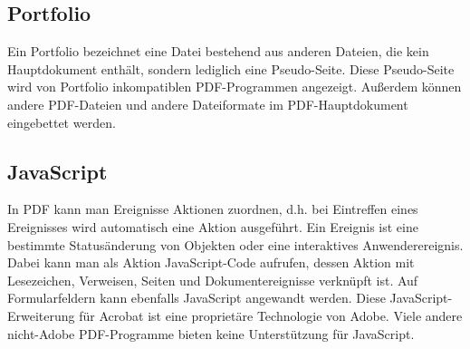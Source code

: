 \subsection{Portfolio}
Ein Portfolio bezeichnet eine Datei bestehend aus anderen Dateien, die kein Hauptdokument enthält, sondern lediglich eine Pseudo-Seite. Diese Pseudo-Seite wird von Portfolio inkompatiblen PDF-Programmen angezeigt. Außerdem können andere PDF-Dateien und andere Dateiformate im PDF-Hauptdokument eingebettet werden. \cite{softx}

\subsection{JavaScript}
In PDF kann man Ereignisse Aktionen zuordnen, d.h. bei Eintreffen eines Ereignisses wird automatisch eine Aktion ausgeführt. Ein Ereignis ist eine bestimmte Statusänderung von Objekten oder eine interaktives Anwenderereignis. Dabei kann man als Aktion JavaScript-Code aufrufen, dessen Aktion mit Lesezeichen, Verweisen, Seiten und Dokumentereignisse verknüpft ist. Auf Formularfeldern kann ebenfalls JavaScript angewandt werden. \cite{softx} Diese JavaScript-Erweiterung für Acrobat ist eine proprietäre Technologie von Adobe. Viele andere nicht-Adobe PDF-Programme bieten keine Unterstützung für JavaScript. \cite{wiki-pdf-engl}